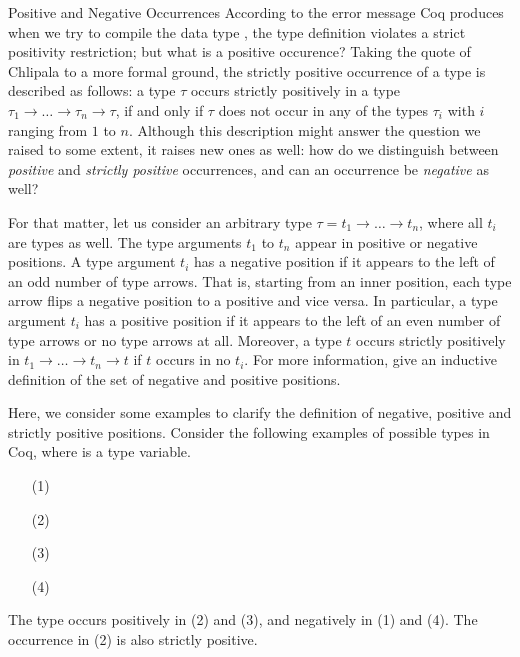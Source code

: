 \begin{excursus}{Positive and Negative Occurrences}
According to the error message Coq produces when we try to compile the data type , the type definition violates a strict positivity restriction; but what is a positive occurence?
Taking the quote of Chlipala to a more formal ground, the strictly positive occurrence of a type is described as follows: a type $\tau$ occurs strictly positively in a type $\tau_1\rightarrow \dots \rightarrow \tau_n \rightarrow \tau$, if and only if $\tau$ does not occur in any of the types $\tau_i$ with $i$ ranging from $1$ to $n$.
Although this description might answer the question we raised to some extent, it raises new ones as well: how do we distinguish between \emph{positive} and \emph{strictly positive} occurrences, and can an occurrence be \emph{negative} as well?

For that matter, let us consider an arbitrary type $\tau = t_1 \rightarrow \dots \rightarrow t_n$, where all $t_i$ are types as well.
The type arguments $t_1$ to $t_n$ appear in positive or negative positions.
A type argument $t_i$ has a negative position if it appears to the left of an odd number of type arrows.
That is, starting from an inner position, each type arrow flips a negative position to a positive and vice versa.
In particular, a type argument $t_i$ has a positive position if it appears to the left of an even number of type arrows or no type arrows at all.
Moreover, a type $t$ occurs strictly positively in $t_1 \rightarrow \dots \rightarrow t_n \rightarrow t$ if $t$ occurs in no $t_i$.
For more information, \citet{blanqui2002inductivedatatype}  give an inductive definition of the set of negative and positive positions.

Here, we consider some examples to clarify the definition of negative, positive and strictly positive positions.
Consider the following examples of possible types in Coq, where  is a type variable.

\begin{enumerate}
\item[(1)] 
\item[(2)] 
\item[(3)] 
\item[(4)] 
\end{enumerate}

The type  occurs positively in (2) and (3), and negatively in (1) and (4).
The occurrence in (2) is also strictly positive.


\end{excursus}
